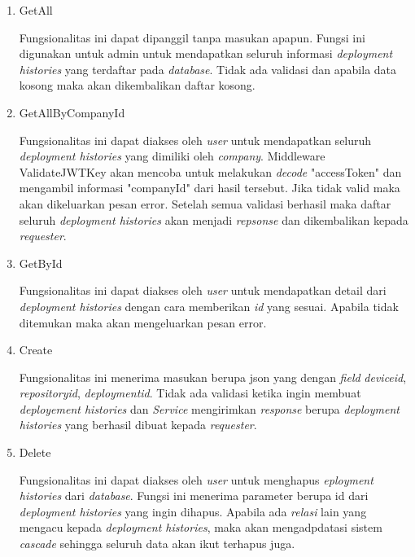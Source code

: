 \begin{enumerate}
  \item GetAll

        Fungsionalitas ini dapat dipanggil tanpa masukan apapun. Fungsi ini digunakan untuk admin untuk mendapatkan seluruh informasi \textit{deployment histories} yang terdaftar pada \textit{database}. Tidak ada validasi dan apabila data kosong maka akan dikembalikan daftar kosong.

  \item GetAllByCompanyId

        Fungsionalitas ini dapat diakses oleh \textit{user} untuk mendapatkan seluruh \textit{deployment histories} yang dimiliki oleh \textit{company}. Middleware ValidateJWTKey akan mencoba untuk melakukan \textit{decode} "accessToken" dan mengambil informasi "companyId" dari hasil tersebut. Jika tidak valid maka akan dikeluarkan pesan error. Setelah semua validasi berhasil maka daftar seluruh \textit{deployment histories} akan menjadi \textit{repsonse} dan dikembalikan kepada \textit{requester}.

  \item GetById

        Fungsionalitas ini dapat diakses oleh \textit{user} untuk mendapatkan detail dari \textit{deployment histories} dengan cara memberikan \textit{id} yang sesuai. Apabila tidak ditemukan maka akan mengeluarkan pesan error.

  \item Create

        Fungsionalitas ini menerima masukan berupa json yang dengan \textit{field} \textit{device\textunderscore id}, \textit{repository\textunderscore id}, \textit{deployment\textunderscore id}. Tidak ada validasi ketika ingin membuat \textit{deployement histories} dan \textit{Service} mengirimkan \textit{response} berupa \textit{deployment histories} yang berhasil dibuat kepada \textit{requester}.

  \item Delete

        Fungsionalitas ini dapat diakses oleh \textit{user} untuk menghapus \textit{eployment histories} dari \textit{database}. Fungsi ini menerima parameter berupa id dari \textit{deployment histories} yang ingin dihapus. Apabila ada \textit{relasi} lain yang mengacu kepada \textit{deployment histories}, maka akan mengadpdatasi sistem \textit{cascade} sehingga seluruh data akan ikut terhapus juga.

\end{enumerate}

